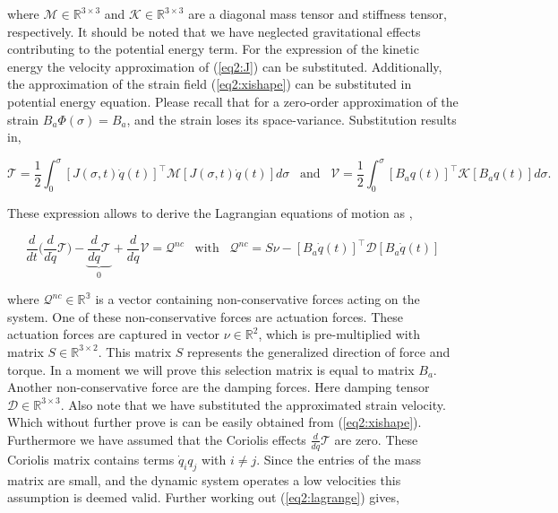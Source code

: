 where $\mathcal{M} \in \mathbb{R}^{3\times3}$ and $\mathcal{K} \in \mathbb{R}^{3\times3}$ are a diagonal mass tensor and stiffness tensor, respectively. It should be noted that we have neglected gravitational effects contributing to the potential energy term. For the expression of the kinetic energy the velocity approximation of (\ref{eq2:J}) can be substituted. Additionally, the approximation of the strain field (\ref{eq2:xishape}) can be substituted in potential energy equation. Please recall that for a zero-order approximation of the strain $B_a \Phi(\sigma)= B_a$, and the strain loses its space-variance. Substitution results in,

\begin{equation}
    \mathcal{T} = \frac{1}{2}\int_0^{\sigma} [J(\sigma,t)\dot{q}(t)]^\top \mathcal{M} [J(\sigma,t)\dot{q}(t)] d \sigma  \hspace{10pt} \text{and} \hspace{10pt}  \mathcal{V} = \frac{1}{2}\int_0^{\sigma} [B_aq(t)]^\top \mathcal{K} [B_a q(t)] d \sigma.
\end{equation}

These expression allows to derive the Lagrangian equations of motion as \cite{NWouw},

\begin{equation}
    \frac{d}{dt}\Big( \frac{d}{d\dot{q}}\mathcal{T}\Big)- \underbrace{\frac{d}{dq}\mathcal{T}}_0 + \frac{d}{dq}\mathcal{V} = \mathcal{Q}^{nc} \hspace{10pt} \text{with} \hspace{10pt} \mathcal{Q}^{nc} =  S\nu - [B_a\dot{q}(t)]^\top \mathcal{D} [B_a\dot{q}(t)]
    \label{eq2:lagrange}
\end{equation}

where $\mathcal{Q}^{nc} \in \mathbb{R^3}$ is a vector containing non-conservative forces acting on the system. One of these non-conservative forces are actuation forces. These actuation forces are captured in vector $\nu \in \mathbb{R}^2$, which is pre-multiplied with matrix $S \in \mathbb{R}^{3\times 2}$. This matrix $S$ represents the generalized direction of force and torque. In a moment we will prove this selection matrix is equal to matrix $B_a$. Another non-conservative force are the damping forces. Here damping tensor $\mathcal{D} \in \mathbb{R}^{3 \times 3}$. Also note that we have substituted the approximated strain velocity. Which without further prove is can be easily obtained from (\ref{eq2:xishape}). Furthermore we have assumed that the Coriolis effects $\frac{d}{dq}\mathcal{T}$ are zero. These Coriolis matrix contains terms $\dot{q}_i q_j$ with $i \neq j$. Since the entries of the mass matrix are small, and the dynamic system operates a low velocities this assumption is deemed valid. Further working out (\ref{eq2:lagrange}) gives,

